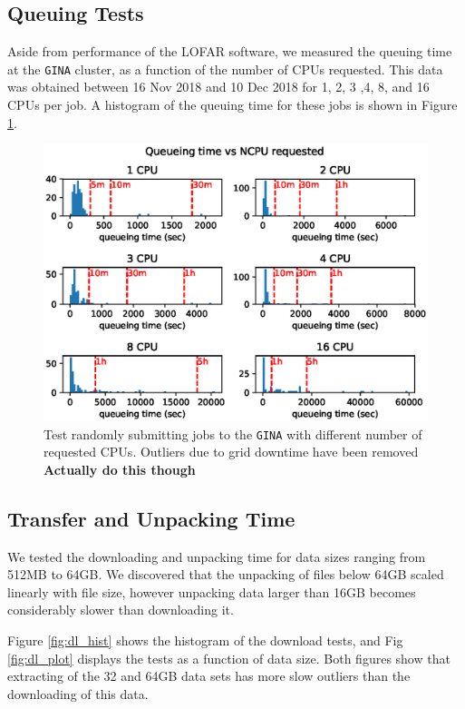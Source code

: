 \documentclass[preprint,5p]{elsarticle}
\begin{document}
\subsection{Queuing Tests}

Aside from performance of the LOFAR software, we measured the queuing time at the \texttt{GINA} cluster, as a function of the number of CPUs requested. This data was obtained between 16 Nov 2018 and 10 Dec 2018 for 1,  2, 3 ,4, 8, and 16 CPUs per job. A histogram of the queuing time for these jobs is shown in Figure \ref{fig:queue_NCPU}.

\begin{figure}
    \includegraphics[width=0.95\linewidth]{figures/Queue_NCPU.eps}
      \caption{Test randomly submitting jobs to the \texttt{GINA} with different number of requested CPUs. Outliers due to grid downtime have been removed \textbf{Actually do this though} }
	\label{fig:queue_NCPU}
\end{figure}


\subsection{Transfer and Unpacking Time}

We tested the downloading and unpacking time for data sizes ranging from 512MB to 64GB. We discovered that the unpacking of files below 64GB scaled linearly with file size, however unpacking data larger than 16GB becomes considerably slower than downloading it. 

Figure \ref{fig:dl_hist} shows the histogram of the download tests, and Fig \ref{fig:dl_plot} displays the tests as a function of data size. Both figures show that extracting of the 32 and 64GB data sets has more slow outliers than the downloading of this data. 
\end{document}

